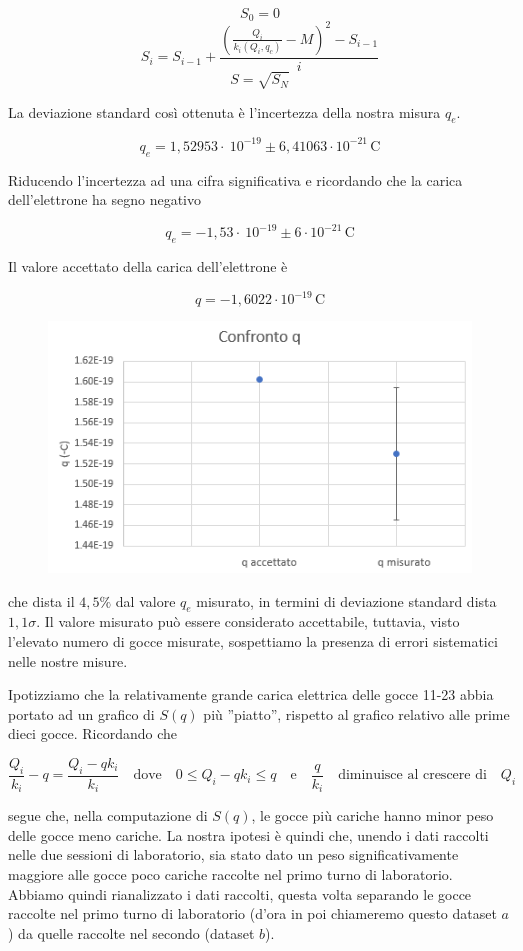 \documentclass{article}
\begin{document}
\[S_0 = 0\]
\[S_i = S_{i-1} + \frac{(\frac{Q_i}{k_i(Q_i,q_c)} - M)^2 - S_{i-1}}{i}\]
\[S=\sqrt{S_N}\]

La deviazione standard così ottenuta è l'incertezza della nostra misura $q_e$.

\[q_e = 1,52953 \cdot\ 10^{-19} \pm 6,41063 \cdot 10^{-21} \, \textrm{C}\]

Riducendo l'incertezza ad una cifra significativa e ricordando che la carica dell'elettrone ha segno negativo

\[q_e = - 1,53 \cdot\ 10^{-19} \pm 6 \cdot 10^{-21} \, \textrm{C}\]

Il valore accettato della carica dell'elettrone è 

\[q= - 1,6022 \cdot 10^{-19} \, \textrm{C}\]

\begin{figure}[h]
\centering
\includegraphics[width=0.7\linewidth]{Confronto_q}
\end{figure}

che dista il $4,5 \%$ dal valore $q_e$ misurato, in termini di deviazione standard dista $1,1 \sigma$. Il valore misurato può essere considerato accettabile, tuttavia, visto l'elevato numero di gocce misurate, sospettiamo la presenza di errori sistematici nelle nostre misure.

\vspace{5mm}

Ipotizziamo che la relativamente grande carica elettrica delle gocce 11-23 abbia portato ad un grafico di $S(q)$ più ''piatto'', rispetto al grafico relativo alle prime dieci gocce. Ricordando che 

\[\frac{Q_i}{k_i} - q = \frac{Q_i - qk_i}{k_i} \quad \textrm{dove} \quad 0 \leq Q_i - qk_i \leq q \quad \textrm{e} \quad \frac{q}{k_i} \quad \textrm{diminuisce al crescere di} \quad Q_i\]

segue che, nella computazione di $S(q)$, le gocce più cariche hanno minor peso delle gocce meno cariche. La nostra ipotesi è quindi che, unendo i dati raccolti nelle due sessioni di laboratorio, sia stato dato un peso significativamente maggiore alle gocce poco cariche raccolte nel primo turno di laboratorio. Abbiamo quindi rianalizzato i dati raccolti, questa volta separando le gocce raccolte nel primo turno di laboratorio (d'ora in poi chiameremo questo dataset $a$) da quelle raccolte nel secondo (dataset $b$).
\end{document}
